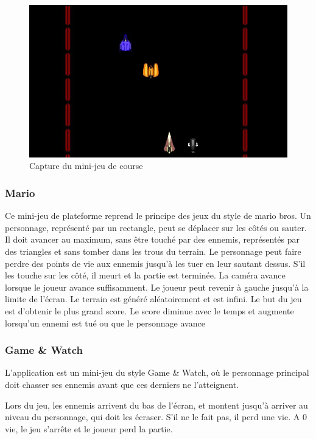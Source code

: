 \begin{figure}
 \includegraphics[width=\linewidth]{img/capturejeu_course}
 \caption{Capture du mini-jeu de course}
 \label{fig:game_course}
\end{figure}

\subsubsection{Mario}

Ce mini-jeu de plateforme reprend le principe des jeux du style de mario bros.
Un personnage, représenté par un rectangle, peut se déplacer sur les côtés ou sauter.
Il doit avancer au maximum, sans être touché par des ennemis, représentés par des triangles et sans tomber dans les trous du terrain.
Le personnage peut faire perdre des points de vie aux ennemis jusqu'à les tuer en leur sautant dessus. S'il les touche sur les côté, 
il meurt et la partie est terminée.
La caméra avance lorsque le joueur avance suffisamment. Le joueur peut revenir à gauche jusqu'à la limite de l'écran.
Le terrain est généré aléatoirement et est infini.
Le but du jeu est d'obtenir le plus grand score. Le score diminue avec le temps et augmente lorsqu'un ennemi est tué ou que le personnage avance

\subsubsection{Game \& Watch}

L’application est un mini-jeu du style Game \& Watch, où le personnage principal doit chasser ses ennemis avant que ces derniers ne l’atteignent.

Lors du jeu, les ennemis arrivent du bas de l’écran, et montent jusqu’à arriver au niveau du personnage, qui doit les écraser. S’il ne le fait pas, 
il perd une vie. A 0 vie, le jeu s’arrête et le joueur perd la partie.

